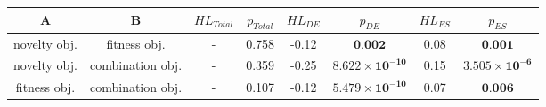 \begin{tabular}{cccccccc}
\toprule
           A &                B & ${HL}_{Total}$ & $p_{Total}$ & ${HL}_{DE}$ &                         $p_{DE}$ & ${HL}_{ES}$ &                        $p_{ES}$ \\
\midrule
novelty obj. &     fitness obj. &              - &       0.758 &       -0.12 &                 $\textbf{0.002}$ &        0.08 &                $\textbf{0.001}$ \\
novelty obj. & combination obj. &              - &       0.359 &       -0.25 & $\mathbf{8.622 \times 10^{-10}}$ &        0.15 & $\mathbf{3.505 \times 10^{-6}}$ \\
fitness obj. & combination obj. &              - &       0.107 &       -0.12 & $\mathbf{5.479 \times 10^{-10}}$ &        0.07 &                $\textbf{0.006}$ \\
\bottomrule
\end{tabular}
